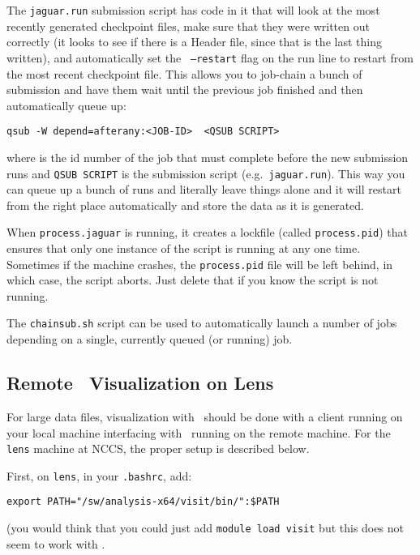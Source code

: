 The {\tt jaguar.run} submission script has code in it that will look
at the most recently generated checkpoint files, make sure that they
were written out correctly (it looks to see if there is a Header file,
since that is the last thing written), and automatically set the {\tt
  --restart} flag on the run line to restart from the most recent
checkpoint file.  This allows you to job-chain a bunch of submission
and have them wait until the previous job finished and then
automatically queue up:
\begin{verbatim}
qsub -W depend=afterany:<JOB-ID>  <QSUB SCRIPT>
\end{verbatim}
where {\tt <JOB-ID>} is the id number of the job that must complete
before the new submission runs and {\tt QSUB SCRIPT} is the submission
script (e.g.\ {\tt jaguar.run}).
This way you can queue up a bunch of runs and literally leave things
alone and it will restart from the right place automatically and store
the data as it is generated.

When {\tt process.jaguar} is running, it creates a lockfile (called
{\tt process.pid}) that ensures that only one instance of the script
is running at any one time.  Sometimes if the machine crashes, the
{\tt process.pid} file will be left behind, in which case, the script
aborts.  Just delete that if you know the script is not running.

The {\tt chainsub.sh} script can be used to automatically launch a number
of jobs depending on a single, currently queued (or running) job.


\subsection{Remote \visit\ Visualization on Lens}

For large data files, visualization with \visit\ should be done with
a client running on your local machine interfacing with \visit\ running
on the remote machine.  For the {\tt lens} machine at NCCS, the proper setup
is described below.

First, on {\tt lens}, in your {\tt .bashrc}, add:
\begin{verbatim}
export PATH="/sw/analysis-x64/visit/bin/":$PATH
\end{verbatim}
(you would think that you could just add {\tt module load visit} but this
does not seem to work with \visit.


